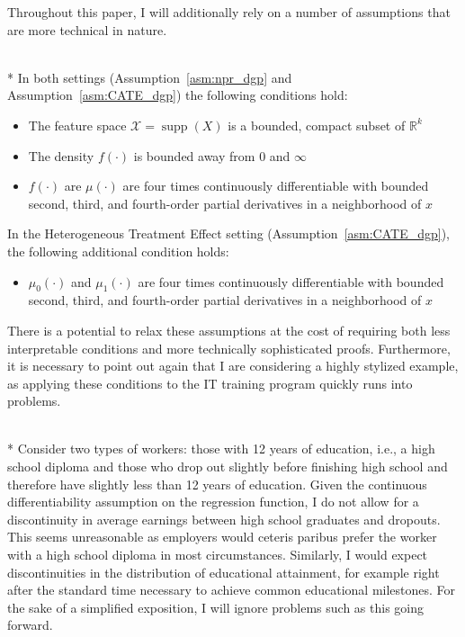 Throughout this paper, I will additionally rely on a number of assumptions that are more technical in nature.
\begin{boxD}
	\begin{asm}\label{asm:technical}\mbox{}\\*
		In both settings (Assumption~\ref{asm:npr_dgp} and Assumption~\ref{asm:CATE_dgp}) the following conditions hold:
		\begin{itemize}
			\item The feature space $\mathcal{X} = \operatorname{supp}(X)$ is a bounded, compact subset of $\mathbb{R}^k$
			\item The density $f(\cdot)$ is bounded away from 0 and $\infty$
			\item $f(\cdot)$ are $\mu(\cdot)$ are four times continuously differentiable with bounded second, third, and fourth-order partial derivatives in a neighborhood of $x$
		\end{itemize}
		In the Heterogeneous Treatment Effect setting (Assumption~\ref{asm:CATE_dgp}), the following additional condition holds:
		\begin{itemize}
			\item $\mu_0(\cdot)$ and $\mu_1(\cdot)$ are four times continuously differentiable with bounded second, third, and fourth-order partial derivatives in a neighborhood of $x$
		\end{itemize}
	\end{asm}
\end{boxD}
There is a potential to relax these assumptions at the cost of requiring both less interpretable conditions and more technically sophisticated proofs.
Furthermore, it is necessary to point out again that I are considering a highly stylized example, as applying these conditions to the IT training program quickly runs into problems.
\begin{boxE}
    \addtocounter{exmp}{-1}
    \begin{exmp}\mbox{}\\*
        Consider two types of workers: those with 12 years of education, i.e., a high school diploma and those who drop out slightly before finishing high school and therefore have slightly less than 12 years of education.
        Given the continuous differentiability assumption on the regression function, I do not allow for a discontinuity in average earnings between high school graduates and dropouts.
        This seems unreasonable as employers would ceteris paribus prefer the worker with a high school diploma in most circumstances.
        Similarly, I would expect discontinuities in the distribution of educational attainment, for example right after the standard time necessary to achieve common educational milestones.
        For the sake of a simplified exposition, I will ignore problems such as this going forward.
    \end{exmp}    
\end{boxE}
